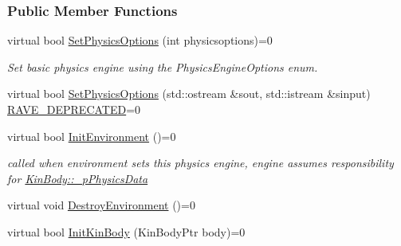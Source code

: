 \subsubsection*{Public Member Functions}
\begin{DoxyCompactItemize}
\item 
\hypertarget{classOpenRAVE_1_1PhysicsEngineBase_a1a564c7b9b8e445067840544e1899454}{
virtual bool \hyperlink{classOpenRAVE_1_1PhysicsEngineBase_a1a564c7b9b8e445067840544e1899454}{SetPhysicsOptions} (int physicsoptions)=0}
\label{classOpenRAVE_1_1PhysicsEngineBase_a1a564c7b9b8e445067840544e1899454}

\begin{DoxyCompactList}\small\item\em Set basic physics engine using the PhysicsEngineOptions enum. \item\end{DoxyCompactList}\item 
virtual bool \hyperlink{classOpenRAVE_1_1PhysicsEngineBase_a7cc87335dc1afb1ab99e53b7a4a70ac7}{SetPhysicsOptions} (std::ostream \&sout, std::istream \&sinput) \hyperlink{namespaceOpenRAVE_af23fc4c2c72950a8c02f38ef71680bc6}{RAVE\_\-DEPRECATED}=0
\item 
\hypertarget{classOpenRAVE_1_1PhysicsEngineBase_a253ffd76b6c58523ff7813a7e777cce0}{
virtual bool \hyperlink{classOpenRAVE_1_1PhysicsEngineBase_a253ffd76b6c58523ff7813a7e777cce0}{InitEnvironment} ()=0}
\label{classOpenRAVE_1_1PhysicsEngineBase_a253ffd76b6c58523ff7813a7e777cce0}

\begin{DoxyCompactList}\small\item\em called when environment sets this physics engine, engine assumes responsibility for \hyperlink{classOpenRAVE_1_1KinBody_a3f8a2e40760cf2ee75f604c0f18b27ec}{KinBody::\_\-pPhysicsData} \item\end{DoxyCompactList}\item 
virtual void \hyperlink{classOpenRAVE_1_1PhysicsEngineBase_addd261b357621ad88f262f311792efb6}{DestroyEnvironment} ()=0
\item 
\hypertarget{classOpenRAVE_1_1PhysicsEngineBase_a7daf60b368b32643ad95691260b5246a}{
virtual bool \hyperlink{classOpenRAVE_1_1PhysicsEngineBase_a7daf60b368b32643ad95691260b5246a}{InitKinBody} (KinBodyPtr body)=0}
\label{classOpenRAVE_1_1PhysicsEngineBase_a7daf60b368b32643ad95691260b5246a}


\end{DoxyCompactItemize}
